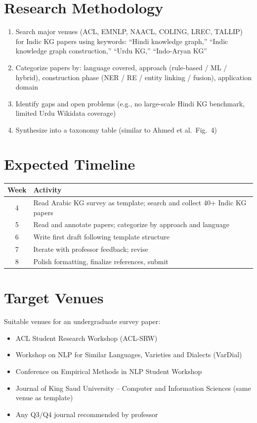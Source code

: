\section{Research Methodology}

\begin{enumerate}[nosep]
    \item Search major venues (ACL, EMNLP, NAACL, COLING, LREC, TALLIP) for Indic KG papers using keywords: ``Hindi knowledge graph,'' ``Indic knowledge graph construction,'' ``Urdu KG,'' ``Indo-Aryan KG''
    \item Categorize papers by: language covered, approach (rule-based / ML / hybrid), construction phase (NER / RE / entity linking / fusion), application domain
    \item Identify gaps and open problems (e.g., no large-scale Hindi KG benchmark, limited Urdu Wikidata coverage)
    \item Synthesize into a taxonomy table (similar to Ahmed et al.\ Fig.\ 4)
\end{enumerate}

\section{Expected Timeline}

\begin{table}[h]
\centering
\begin{tabularx}{\textwidth}{cX}
\toprule
\textbf{Week} & \textbf{Activity} \\
\midrule
4 & Read Arabic KG survey as template; search and collect 40+ Indic KG papers \\
5 & Read and annotate papers; categorize by approach and language \\
6 & Write first draft following template structure \\
7 & Iterate with professor feedback; revise \\
8 & Polish formatting, finalize references, submit \\
\bottomrule
\end{tabularx}
\end{table}

\section{Target Venues}

Suitable venues for an undergraduate survey paper:
\begin{itemize}[nosep]
    \item ACL Student Research Workshop (ACL-SRW)
    \item Workshop on NLP for Similar Languages, Varieties and Dialects (VarDial)
    \item Conference on Empirical Methods in NLP Student Workshop
    \item Journal of King Saud University -- Computer and Information Sciences (same venue as template)
    \item Any Q3/Q4 journal recommended by professor
\end{itemize}
